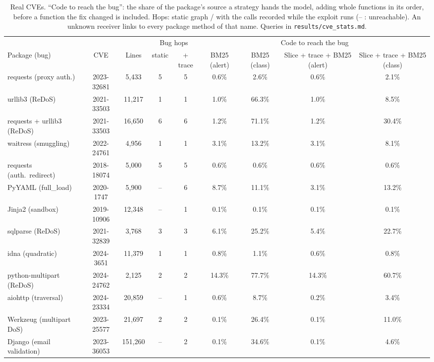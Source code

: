 \documentclass[journal]{IEEEtran}
\newcommand{\code}[1]{\texttt{#1}}
\begin{document}
\begin{table}[!t]
\centering\small
\caption{Real CVEs. ``Code to reach the bug'': the share of the package's source a strategy hands the model, adding whole functions in its order, before a function the fix changed is included. Hops: static graph / with the calls recorded while the exploit runs (-- : unreachable). An unknown receiver links to every package method of that name. Queries in \code{results/cve\_stats.md}.}
\label{tab:cve}
\begin{adjustbox}{max width=\linewidth}\begin{tabular}{lcccccccc}
\toprule
& & & \multicolumn{2}{c}{Bug hops} & \multicolumn{4}{c}{Code to reach the bug}\\
\cmidrule(lr){4-5}\cmidrule(lr){6-9}
Package (bug) & CVE & Lines & static & + trace & BM25 (alert) & BM25 (class) & Slice + trace + BM25 (alert) & Slice + trace + BM25 (class)\\
\midrule
requests (proxy auth.) & 2023-32681 & 5,433 & 5 & 5 & 0.6\% & 2.6\% & 0.6\% & 2.1\%\\
urllib3 (ReDoS) & 2021-33503 & 11,217 & 1 & 1 & 1.0\% & 66.3\% & 1.0\% & 8.5\%\\
requests + urllib3 (ReDoS) & 2021-33503 & 16,650 & 6 & 6 & 1.2\% & 71.1\% & 1.2\% & 30.4\%\\
waitress (smuggling) & 2022-24761 & 4,956 & 1 & 1 & 3.1\% & 13.2\% & 3.1\% & 8.1\%\\
requests (auth.\ redirect) & 2018-18074 & 5,000 & 5 & 5 & 0.6\% & 0.6\% & 0.6\% & 0.6\%\\
PyYAML (full\_load) & 2020-1747 & 5,900 & -- & 6 & 8.7\% & 11.1\% & 3.1\% & 13.2\%\\
Jinja2 (sandbox) & 2019-10906 & 12,348 & -- & 1 & 0.1\% & 0.1\% & 0.1\% & 0.1\%\\
sqlparse (ReDoS) & 2021-32839 & 3,768 & 3 & 3 & 6.1\% & 25.2\% & 5.4\% & 22.7\%\\
idna (quadratic) & 2024-3651 & 11,379 & 1 & 1 & 0.8\% & 1.1\% & 0.6\% & 0.8\%\\
python-multipart (ReDoS) & 2024-24762 & 2,125 & 2 & 2 & 14.3\% & 77.7\% & 14.3\% & 60.7\%\\
aiohttp (traversal) & 2024-23334 & 20,859 & -- & 1 & 0.6\% & 8.7\% & 0.2\% & 3.4\%\\
Werkzeug (multipart DoS) & 2023-25577 & 21,697 & 2 & 2 & 0.1\% & 26.4\% & 0.1\% & 11.0\%\\
Django (email validation) & 2023-36053 & 151,260 & -- & 2 & 0.1\% & 34.6\% & 0.1\% & 4.6\%\\
\bottomrule
\end{tabular}\end{adjustbox}
\end{table}
\end{document}
